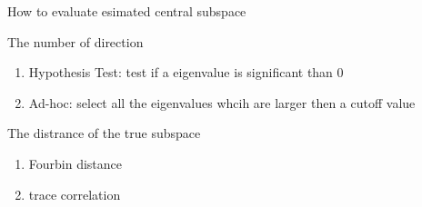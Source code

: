 \documentclass[ignorenonframetext,]{beamer}
\providecommand{\tightlist}{%
  \setlength{\itemsep}{0pt}\setlength{\parskip}{0pt}}
\begin{document}
\begin{frame}{How to evaluate esimated central subspace}

\begin{block}{The number of direction}

\begin{enumerate}
\def\labelenumi{\arabic{enumi}.}
\tightlist
\item
  Hypothesis Test: test if a eigenvalue is significant than 0
\item
  Ad-hoc: select all the eigenvalues whcih are larger then a cutoff
  value
\end{enumerate}

\end{block}

\begin{block}{The distrance of the true subspace}

\begin{enumerate}
\def\labelenumi{\arabic{enumi}.}
\tightlist
\item
  Fourbin distance
\item
  trace correlation
\end{enumerate}

\end{block}

\end{frame}
\end{document}
